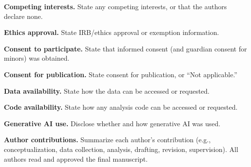 \documentclass[11pt,a4paper]{article}
\begin{document}
\smallskip
\textbf{Competing interests.} State any competing interests, or that the authors declare none.

\smallskip
\textbf{Ethics approval.} State IRB/ethics approval or exemption information.

\smallskip
\textbf{Consent to participate.} State that informed consent (and guardian consent for minors) was obtained.

\smallskip
\textbf{Consent for publication.} State consent for publication, or ``Not applicable.''

\smallskip
\textbf{Data availability.} State how the data can be accessed or requested.

\smallskip
\textbf{Code availability.} State how any analysis code can be accessed or requested.

\smallskip
\textbf{Generative AI use.} Disclose whether and how generative AI was used.

\smallskip
\textbf{Author contributions.} Summarize each author's contribution (e.g., conceptualization, data collection, analysis, drafting, revision, supervision). All authors read and approved the final manuscript.
\end{document}
